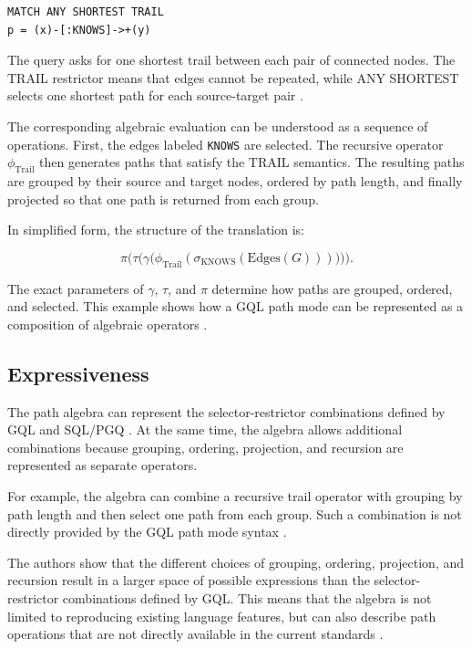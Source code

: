 \begin{verbatim}
MATCH ANY SHORTEST TRAIL
p = (x)-[:KNOWS]->+(y)
\end{verbatim}

The query asks for one shortest trail between each pair of connected nodes. The
TRAIL restrictor means that edges cannot be repeated, while ANY SHORTEST
selects one shortest path for each source-target pair \cite{angles2024path}.

The corresponding algebraic evaluation can be understood as a sequence of
operations. First, the edges labeled \texttt{KNOWS} are selected. The recursive
operator $\phi_{\text{Trail}}$ then generates paths that satisfy the TRAIL
semantics. The resulting paths are grouped by their source and target nodes,
ordered by path length, and finally projected so that one path is returned from
each group.

In simplified form, the structure of the translation is:

\[
\pi \Big(
    \tau \big(
        \gamma \big(
            \phi_{\text{Trail}}(
                \sigma_{\text{KNOWS}}(\text{Edges}(G))
            )
        \big)
    \big)
\Big).
\]

The exact parameters of $\gamma$, $\tau$, and $\pi$ determine how paths are
grouped, ordered, and selected. This example shows how a GQL path mode can be
represented as a composition of algebraic operators \cite{angles2024path}.

\subsection{Expressiveness}

The path algebra can represent the selector-restrictor combinations defined by
GQL and SQL/PGQ \cite{angles2024path}. At the same time, the algebra allows
additional combinations because grouping, ordering, projection, and recursion
are represented as separate operators.

For example, the algebra can combine a recursive trail operator with grouping
by path length and then select one path from each group. Such a combination is
not directly provided by the GQL path mode syntax \cite{angles2024path}.

The authors show that the different choices of grouping, ordering, projection,
and recursion result in a larger space of possible expressions than the
selector-restrictor combinations defined by GQL. This means that the algebra
is not limited to reproducing existing language features, but can also describe
path operations that are not directly available in the current standards
\cite{angles2024path}.